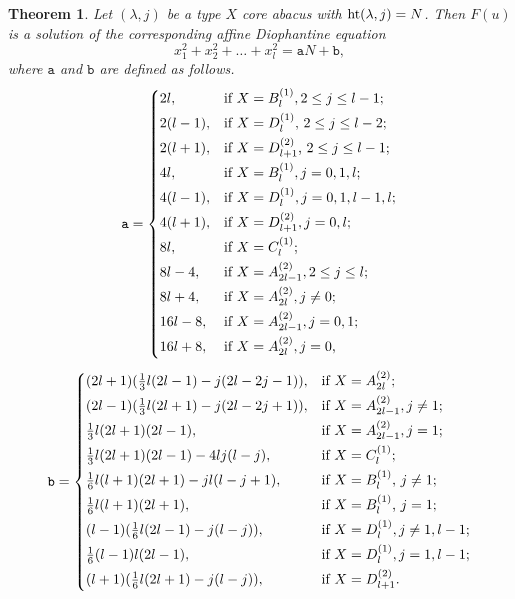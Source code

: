 \documentclass[11pt]{amsart}
\theoremstyle{plain}
\numberwithin{equation}{subsection}
\newtheorem{theorem}{Theorem}[section]
\newcommand{\lam}{\lambda}
\begin{document}
\begin{theorem}\label{4.16}
Let $(\lam, j)$ be a type $X$ core abacus with ${\rm ht}(\lambda, j)=N$. 
Then $F(u)$ is a solution of the corresponding affine Diophantine equation $$x_1^2+x_2^2+\dots+x_l^2=\mathtt{a}N+\mathtt{b},$$
where $\mathtt{a}$ and $\mathtt{b}$ are defined as follows.
$$\mathtt{a}=\begin{cases}
\smallskip
2l, & \text{{\rm if} $X=B_l^{(1)}, 2\leq j\leq l-1$};\\
\smallskip
2(l-1), & \text{{\rm if} $X=D_l^{(1)}$, $2\leq j\leq l-2$};\\
\smallskip
2(l+1), & \text{{\rm if} $X=D_{l+1}^{(2)}$, $2\leq j\leq l-1$};\\
\smallskip
4l, & \text{{\rm if} $X=B_l^{(1)}, j=0, 1, l$};\\
\smallskip
4(l-1), & \text{{\rm if} $X=D_l^{(1)}, j=0,1, l-1, l$};\\
\smallskip
4(l+1), & \text{{\rm if} $X=D_{l+1}^{(2)}, j =0, l$};\\
\smallskip
8l, & \text{{\rm if} $X=C_{l}^{(1)}$};\\
\smallskip
8l-4, & \text{{\rm if} $X=A_{2l-1}^{(2)}, 2\leq j\leq l$};\\
\smallskip
8l+4, & \text{{\rm if} $X=A_{2l}^{(2)}, j\neq 0$};\\
\smallskip
16l-8, & \text{{\rm if} $X=A_{2l-1}^{(2)}, j=0, 1$};\\
\smallskip
16l+8, & \text{{\rm if} $X=A_{2l}^{(2)}, j = 0$,}
\end{cases}$$
$$\mathtt{b}=\begin{cases}
\smallskip
(2l+1)(\frac{1}{3}l(2l-1)-j(2l-2j-1)), & \text{{\rm if} $X=A_{2l}^{(2)}$};\\
\smallskip
(2l-1)(\frac{1}{3}l(2l+1)-j(2l-2j+1)), & \text{{\rm if} $X=A_{2l-1}^{(2)}, j\neq 1$};\\
\smallskip
\frac{1}{3}l(2l+1)(2l-1), & \text{{\rm if} $X=A_{2l-1}^{(2)}, j= 1$};\\
\smallskip
\frac{1}{3}l(2l+1)(2l-1)-4lj(l-j), & \text{{\rm if} $X=C_l^{(1)}$};\\
\smallskip
\frac{1}{6}l(l+1)(2l+1)-jl(l-j+1), & \text{{\rm if} $X=B_l^{(1)}$, $j\neq 1$};\\
\smallskip
\frac{1}{6}l(l+1)(2l+1), & \text{{\rm if} $X=B_l^{(1)}$, $j= 1$};\\
\smallskip
(l-1)(\frac{1}{6}l(2l-1)-j(l-j)), & \text{{\rm if} $X=D_l^{(1)}, j\neq 1, l-1$};\\
\smallskip
\frac{1}{6}(l-1)l(2l-1), & \text{{\rm if} $X=D_l^{(1)}, j= 1, l-1$};\\
\smallskip
(l+1)(\frac{1}{6}l(2l+1)-j(l-j)), & \text{{\rm if} $X=D_{l+1}^{(2)}$}.\\
\end{cases}$$
\end{theorem}
\end{document}
